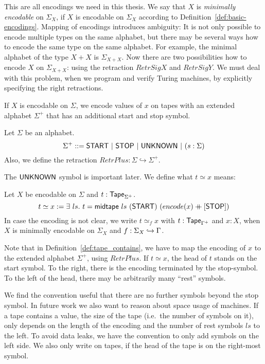 This are all encodings we need in this thesis.  We say that $X$ is \textit{minimally encodable} on $\Sigma_X$, if $X$ is encodable on $\Sigma_X$
according to Definition~\ref{def:basic-encodings}.  Mapping of encodings introduces ambiguity: It is not only possible to encode multiple types on the
same alphabet, but there may be several ways how to encode the same type on the same alphabet.  For example, the minimal alphabet of the type $X+X$ is
$\Sigma_{X+X}$.  Now there are two possibilities how to encode $X$ on $\Sigma_{X+X}$: using the retraction $RetrSigX$ and $RetrSigY$.  We must deal
with this problem, when we program and verify Turing machines, by explicitly specifying the right retractions.

If $X$ is encodable on $\Sigma$, we encode values of $x$ on tapes with an extended alphabet $\Sigma^+$ that has an additional start and stop symbol.
%
\begin{definition}[$\Sigma^+$][boundary]
  Let $\Sigma$ be an alphabet.
  \[
    \Sigma^+ ::= \mathsf{START} ~|~ \mathsf{STOP} ~|~ \mathsf{UNKNOWN} ~|~ (s: \Sigma)
  \]
  Also, we define the retraction $RetrPlus : \Sigma \hookrightarrow \Sigma^+$.
\end{definition}
The $\mathsf{UNKNOWN}$ symbol is important later. We define what $t \simeq x$ means:
\begin{definition}
  \label{def:tape_contains}
  Let $X$ be encodable on $\Sigma$ and $t : \mathsf{Tape}_{\Sigma^+}$.
  \[
    t \simeq x := \exists~ls.~
    t = \mathsf{midtape}~ls~(\mathsf{START})~(encode(x) \mathbin{+\mkern-10mu+} [\mathsf{STOP}])
  \]
  In case the encoding is not clear, we write $t \simeq_f x$ with $t:\mathsf{Tape}_{\Gamma^+}$ and $x:X$, when $X$ is minimally encodable on $\Sigma_X$ and
  $f: \Sigma_X \hookrightarrow \Gamma$.
\end{definition}

Note that in Definition~\ref{def:tape_contains}, we have to map the encoding of $x$ to the extended alphabet $\Sigma^+$, using $RetrPlus$.  If
$t \simeq x$, the head of $t$ stands on the start symbol.  To the right, there is the encoding terminated by the stop-symbol.  To the left of the
head, there may be arbitrarily many ``rest'' symbols.

We find the convention useful that there are no further symbols beyond the stop symbol.  In future work we also want to reason about space usage of
machines.  If a tape contains a value, the size of the tape (i.e.\ the number of symbols on it), only depends on the length of the encoding and the
number of rest symbols $ls$ to the left.  To avoid data leaks, we have the convention to only add symbols on the left side.  We also only write on
tapes, if the head of the tape is on the right-most symbol.

